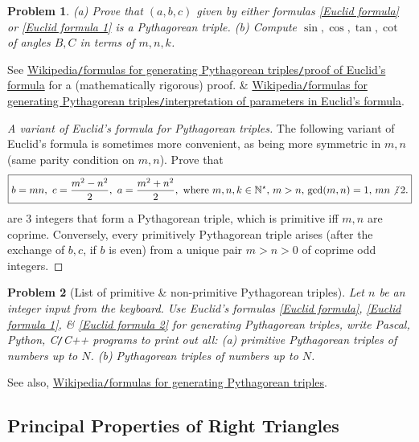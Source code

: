 \documentclass{article}
\newtheorem{problem}{Problem}
\DeclareRobustCommand{\divby}{%
	\mathrel{\vbox{\baselineskip.65ex\lineskiplimit0pt\hbox{.}\hbox{.}\hbox{.}}}%
}
\begin{document}
\begin{problem}
	(a) Prove that $(a,b,c)$ given by either formulas \eqref{Euclid formula} or \eqref{Euclid formula 1} is a Pythagorean triple. (b) Compute $\sin,\cos,\tan,\cot$ of angles $B,C$ in terms of $m,n,k$.
\end{problem}
See \href{https://en.wikipedia.org/wiki/Pythagorean_triple#Proof_of_Euclid's_formula}{Wikipedia{\tt/}formulas for generating Pythagorean triples{\tt/}proof of Euclid's formula} for a (mathematically rigorous) proof. \& \href{https://en.wikipedia.org/wiki/Pythagorean_triple#Interpretation_of_parameters_in_Euclid's_formula}{Wikipedia{\tt/}formulas for generating Pythagorean triples{\tt/}interpretation of parameters in Euclid's formula}.

\begin{proof}[A variant of Euclid's formula for Pythagorean triples]
	The following variant of Euclid's formula is sometimes more convenient, as being more symmetric in $m,n$ (same parity condition on $m,n$). Prove that
	\begin{align}
		\label{Euclid formula 2}
		\boxed{b = mn,\ c = \frac{m^2 - n^2}{2},\ a = \frac{m^2 + n^2}{2},\mbox{ where } m,n,k\in\mathbb{N}^\star,\,m > n,\,{\rm gcd}(m,n) = 1,\,mn\not{\divby}\,2.}
	\end{align}
	are 3 integers that form a Pythagorean triple, which is primitive iff $m,n$ are coprime. Conversely, every primitively Pythagorean triple arises (after the exchange of $b,c$, if $b$ is even) from a unique pair $m > n > 0$ of coprime odd integers.
\end{proof}

\begin{problem}[List of primitive \& non-primitive Pythagorean triples]
	Let $n$ be an integer input from the keyboard. Use Euclid's formulas \eqref{Euclid formula}, \eqref{Euclid formula 1}, \& \eqref{Euclid formula 2} for generating Pythagorean triples, write {\sf Pascal, Python, C{\tt/}C++} programs to print out all: (a) primitive Pythagorean triples of numbers up to $N$. (b) Pythagorean triples of numbers up to $N$.
\end{problem}
See also, \href{https://en.wikipedia.org/wiki/Formulas_for_generating_Pythagorean_triples}{Wikipedia{\tt/}formulas for generating Pythagorean triples}.

\subsection{Principal Properties of Right Triangles}
\end{document}
